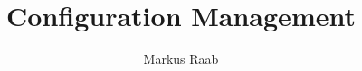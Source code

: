 \DeclareTextFontCommand\textintro{\normalfont\bfseries\itshape} %
\newcommand{\intro}[2][]
{%
	\textintro{#2}%
}
\newcommand{\empha}[2][]
{%
	\emph{#2}%
}

\newtheorem{requirement}[reqcounter]{Requirement}


\makeatletter
\def\th@task{%
    \normalfont %
    \setbeamercolor{block title example}{bg=orange,fg=white}
    \setbeamercolor{block body example}{bg=orange!20,fg=black}
    \def\inserttheoremblockenv{exampleblock}
  }
\makeatother

\theoremstyle{task}
\newtheorem{task}{Task}

\newenvironment{assignment}%
{%
 \setbeamercolor{frametitle}{bg=orange,fg=white}
\begin{frame}}%
{\end{frame}}%




\pgfplotsset{compat=1.14}

\author{Markus Raab}

\title[Configuration Management \hspace{25mm} \insertframenumber/\inserttotalframenumber]{Configuration Management}



